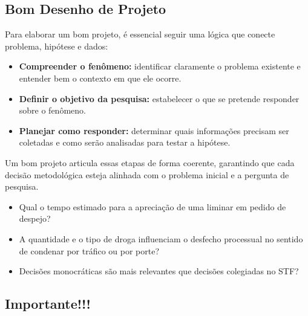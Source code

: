 \documentclass[
  letterpaper,
  DIV=11,
  numbers=noendperiod]{scrreprt}
\providecommand{\tightlist}{%
  \setlength{\itemsep}{0pt}\setlength{\parskip}{0pt}}
\begin{document}
\subsection{Bom Desenho de Projeto}\label{bom-desenho-de-projeto}

Para elaborar um bom projeto, é essencial seguir uma lógica que conecte
problema, hipótese e dados:

\begin{itemize}
\tightlist
\item
  \textbf{Compreender o fenômeno:} identificar claramente o problema
  existente e entender bem o contexto em que ele ocorre.\\
\item
  \textbf{Definir o objetivo da pesquisa:} estabelecer o que se pretende
  responder sobre o fenômeno.\\
\item
  \textbf{Planejar como responder:} determinar quais informações
  precisam ser coletadas e como serão analisadas para testar a hipótese.
\end{itemize}

Um bom projeto articula essas etapas de forma coerente, garantindo que
cada decisão metodológica esteja alinhada com o problema inicial e a
pergunta de pesquisa.

\begin{tcolorbox}[enhanced jigsaw, leftrule=.75mm, coltitle=black, colframe=quarto-callout-warning-color-frame, toprule=.15mm, opacitybacktitle=0.6, bottomtitle=1mm, bottomrule=.15mm, titlerule=0mm, toptitle=1mm, title=\textcolor{quarto-callout-warning-color}{\faExclamationTriangle}\hspace{0.5em}{Exemplo}, arc=.35mm, breakable, opacityback=0, colbacktitle=quarto-callout-warning-color!10!white, colback=white, left=2mm, rightrule=.15mm]

\begin{itemize}
\tightlist
\item
  Qual o tempo estimado para a apreciação de uma liminar em pedido de
  despejo?
\item
  A quantidade e o tipo de droga influenciam o desfecho processual no
  sentido de condenar por tráfico ou por porte?
\item
  Decisões monocráticas são mais relevantes que decisões colegiadas no
  STF?
\end{itemize}

\end{tcolorbox}

\subsection{Importante!!!}\label{importante-1}
\end{document}
